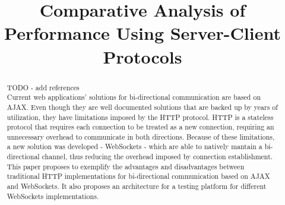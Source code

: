 \documentclass[conference]{IEEEtran}
\begin{document}
\title{Comparative Analysis of Performance Using Server-Client Protocols}

\author{
\and
{}
}

\maketitle

\begin{abstract}
TODO - add references
\\
\indent
Current web applications' solutions for bi-directional communication are based on AJAX.
Even though they are well documented solutions that are backed up by years of
utilization, they have limitations imposed by the HTTP protocol. HTTP is a
stateless protocol that requires each connection to be treated as a new
connection, requiring an unnecessary overhead to communicate in both directions.
Because of these limitations, a new solution was developed - WebSockets -
which are able to natively mantain a bi-directional channel, thus reducing the
overhead imposed by connection establishment.
\\
\indent
This paper proposes to exemplify the advantages and disadvantages between
traditional HTTP implementations for bi-directional communication based on AJAX
and WebSockets. It also proposes an architecture for a testing platform for
different WebSockets implementations.
\end{abstract}

\IEEEpeerreviewmaketitle

\end{document}
